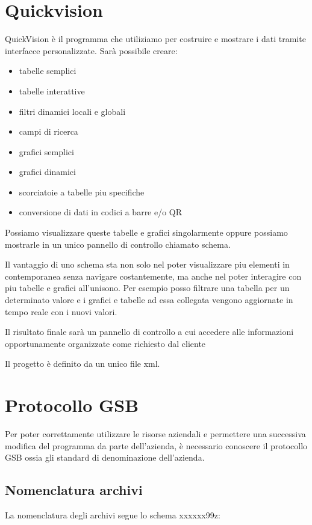 \documentclass[target=bach,aauheader=,style=]{thud}
\begin{document}
\section{Quickvision}
QuickVision è il programma che utiliziamo per costruire e mostrare i dati tramite interfacce personalizzate.
Sarà possibile creare:

\begin{itemize}
    \item tabelle semplici
    \item tabelle interattive
    \item filtri dinamici locali e globali
    \item campi di ricerca
    \item grafici semplici
    \item grafici dinamici
    \item scorciatoie a tabelle piu specifiche
    \item conversione di dati in codici a barre e/o QR
\end{itemize}

Possiamo visualizzare queste tabelle e grafici singolarmente oppure possiamo mostrarle in un unico pannello di controllo chiamato schema.

Il vantaggio di uno schema sta non solo nel poter visualizzare piu elementi in contemporanea senza navigare costantemente, ma anche nel poter interagire con piu tabelle e grafici all'unisono.
Per esempio posso filtrare una tabella per un determinato valore e i grafici e tabelle ad essa collegata vengono aggiornate in tempo reale con i nuovi valori.

Il risultato finale sarà un pannello di controllo a cui accedere alle informazioni opportunamente organizzate come richiesto dal cliente

Il progetto è definito da un unico file xml.

\section{Protocollo GSB}

Per poter correttamente utilizzare le risorse aziendali e permettere una successiva modifica del programma da parte dell'azienda, è necessario conoscere il protocollo GSB ossia gli standard di denominazione dell'azienda.
\subsection{Nomenclatura archivi}
La nomenclatura degli archivi segue lo schema xxxxxx99z:
\end{document}
